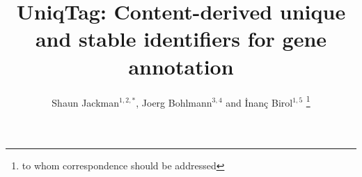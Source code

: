 \documentclass{bioinfo}
\begin{document}

\title[UniqTag]{
UniqTag: Content-derived unique and stable identifiers for gene annotation}
\author[Jackman \textit{et al.}]{
Shaun Jackman$^{1,2,*}$, Joerg Bohlmann$^{3,4}$ and \.{I}nan\c{c} Birol$^{1,5}$
\footnote{to whom correspondence should be addressed}
}

\address{
$^1$Genome Sciences Centre, British Columbia Cancer Agency, Vancouver, BC, Canada
\\$^2$Graduate Program in Bioinformatics, University of British Columbia, Vancouver, BC, Canada
\\$^3$Michael Smith Laboratories, University of British Columbia, Vancouver, BC, Canada
\\$^4$Department of Forest Science, University of British Columbia, Vancouver, BC, Canada
\\$^5$Department of Medical Genetics, University of British Columbia, Vancouver, BC, Canada
}



\maketitle
\end{document}
